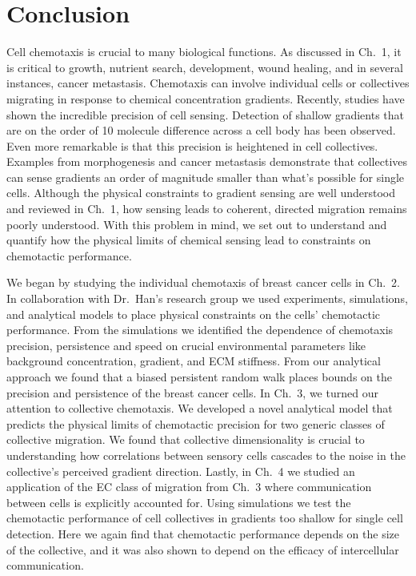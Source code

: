 
\chapter{Conclusion}

\noindent
Cell chemotaxis is crucial to many biological functions. As discussed in Ch.\ 1, it is critical to growth, nutrient search, development, wound healing, and in several instances, cancer metastasis. Chemotaxis can involve individual cells or collectives migrating in response to chemical concentration gradients. Recently, studies have shown the incredible precision of cell sensing. Detection of shallow gradients that are on the order of 10 molecule difference across a cell body has been observed. Even more remarkable is that this precision is heightened in cell collectives. Examples from morphogenesis and cancer metastasis demonstrate that collectives can sense gradients an order of magnitude smaller than what's possible for single cells. Although the physical constraints to gradient sensing are well understood and reviewed in Ch.\ 1, how sensing leads to coherent, directed migration remains poorly understood. With this problem in mind, we set out to understand and quantify how the physical limits of chemical sensing lead to constraints on chemotactic performance.

We began by studying the individual chemotaxis of breast cancer cells in Ch.\ 2. In collaboration with Dr.\ Han's research group we used experiments, simulations, and analytical models to place physical constraints on the cells' chemotactic performance. From the simulations we identified the dependence of chemotaxis precision, persistence and speed on crucial environmental parameters like background concentration, gradient, and ECM stiffness. From our analytical approach we found that a biased persistent random walk places bounds on the precision and persistence of the breast cancer cells. In Ch.\ 3, we turned our attention to collective chemotaxis. We developed a novel analytical model that predicts the physical limits of chemotactic precision for two generic classes of collective migration. We found that collective dimensionality is crucial to understanding how correlations between sensory cells cascades to the noise in the collective's perceived gradient direction. Lastly, in Ch.\ 4 we studied an application of the EC class of migration from Ch.\ 3 where communication between cells is explicitly accounted for. Using simulations we test the chemotactic performance of cell collectives in gradients too shallow for single cell detection. Here we again find that chemotactic performance depends on the size of the collective, and it was also shown to depend on the efficacy of intercellular communication.

